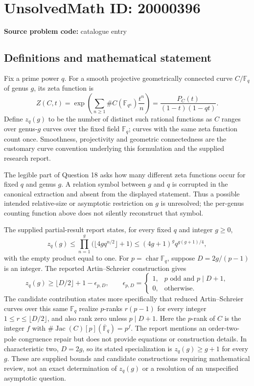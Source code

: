 \documentclass[11pt]{article}
\newcommand{\F}{\mathbb{F}}
\begin{document}
\section*{UnsolvedMath ID: 20000396}
\textbf{Source problem code:} catalogue entry
\subsection{Definitions and mathematical statement}
Fix a prime power \(q\). For a smooth projective geometrically connected curve \(C/\F_q\) of genus \(g\), its zeta function is
\[
 Z(C,t)=\exp\left(\sum_{n\ge1}\#C(\F_{q^n})\frac{t^n}{n}\right)
       =\frac{P_C(t)}{(1-t)(1-qt)}.
\]
Define \(z_q(g)\) to be the number of distinct such rational functions as \(C\) ranges over genus-\(g\) curves over the fixed field \(\F_q\); curves with the same zeta function count once. Smoothness, projectivity and geometric connectedness are the customary curve convention underlying this formulation and the supplied research report.

The legible part of Question 18 asks how many different zeta functions occur for fixed \(q\) and genus \(g\). A relation symbol between \(g\) and \(q\) is corrupted in the canonical extraction and absent from the displayed statement. Thus a possible intended relative-size or asymptotic restriction on \(g\) is unresolved; the per-genus counting function above does not silently reconstruct that symbol.

The supplied partial-result report states, for every fixed \(q\) and integer \(g\ge0\),
\[
 z_q(g)\le\prod_{n=1}^{g}\bigl(\lfloor4gq^{n/2}\rfloor+1\bigr)
 \le(4g+1)^gq^{g(g+1)/4},
\]
with the empty product equal to one. For \(p=\operatorname{char}\F_q\), suppose \(D=2g/(p-1)\) is an integer. The reported Artin--Schreier construction gives
\[
 z_q(g)\ge\lfloor D/2\rfloor+1-\epsilon_{p,D},\qquad
 \epsilon_{p,D}=\begin{cases}1,&p\text{ odd and }p\mid D+1,\\0,&\text{otherwise}.\end{cases}
\]
The candidate contribution states more specifically that reduced Artin--Schreier curves over this same \(\F_q\) realize \(p\)-ranks \(r(p-1)\) for every integer \(1\le r\le\lfloor D/2\rfloor\), and also rank zero unless \(p\mid D+1\). Here the \(p\)-rank of \(C\) is the integer \(f\) with \(\#\operatorname{Jac}(C)[p](\overline{\F}_q)=p^f\). The report mentions an order-two-pole congruence repair but does not provide equations or construction details. In characteristic two, \(D=2g\), so its stated specialization is \(z_q(g)\ge g+1\) for every \(g\). These are supplied bounds and candidate constructions requiring mathematical review, not an exact determination of \(z_q(g)\) or a resolution of an unspecified asymptotic question.
\end{document}

